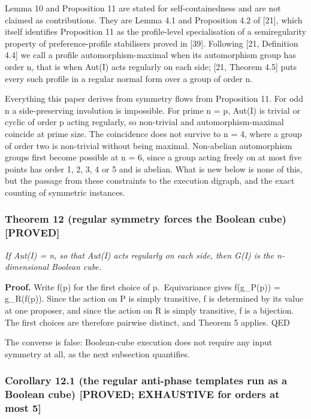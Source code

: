 \documentclass[
  11pt,
]{article}
\begin{document}
Lemma 10 and Proposition 11 are stated for self-containedness and are
not claimed as contributions. They are Lemma 4.1 and Proposition 4.2 of
{[}21{]}, which itself identifies Proposition 11 as the profile-level
specialisation of a semiregularity property of preference-profile
stabilisers proved in {[}39{]}. Following {[}21, Definition 4.4{]} we
call a profile automorphism-maximal when its automorphism group has
order n, that is when Aut(I) acts regularly on each side; {[}21, Theorem
4.5{]} puts every such profile in a regular normal form over a group of
order n.

Everything this paper derives from symmetry flows from Proposition 11.
For odd n a side-preserving involution is impossible. For prime n = p,
Aut(I) is trivial or cyclic of order p acting regularly, so non-trivial
and automorphism-maximal coincide at prime size. The coincidence does
not survive to n = 4, where a group of order two is non-trivial without
being maximal. Non-abelian automorphism groups first become possible at
n = 6, since a group acting freely on at most five points has order 1,
2, 3, 4 or 5 and is abelian. What is new below is none of this, but the
passage from these constraints to the execution digraph, and the exact
counting of symmetric instances.

\hypertarget{theorem-12-regular-symmetry-forces-the-boolean-cube-proved}{%
\subsubsection{Theorem 12 (regular symmetry forces the Boolean cube)
{[}PROVED{]}}\label{theorem-12-regular-symmetry-forces-the-boolean-cube-proved}}

\emph{If \textbar Aut(I)\textbar{} = n, so that Aut(I) acts regularly on
each side, then G(I) is the n-dimensional Boolean cube.}

\textbf{Proof.} Write f(p) for the first choice of p.~Equivariance gives
f(g\_P(p)) = g\_R(f(p)). Since the action on P is simply transitive, f
is determined by its value at one proposer, and since the action on R is
simply transitive, f is a bijection. The first choices are therefore
pairwise distinct, and Theorem 5 applies. QED

The converse is false: Boolean-cube execution does not require any input
symmetry at all, as the next subsection quantifies.

\hypertarget{corollary-12.1-the-regular-anti-phase-templates-run-as-a-boolean-cube-proved-exhaustive-for-orders-at-most-5}{%
\subsubsection{Corollary 12.1 (the regular anti-phase templates run as a
Boolean cube) {[}PROVED; EXHAUSTIVE for orders at most
5{]}}\label{corollary-12.1-the-regular-anti-phase-templates-run-as-a-boolean-cube-proved-exhaustive-for-orders-at-most-5}}
\end{document}
